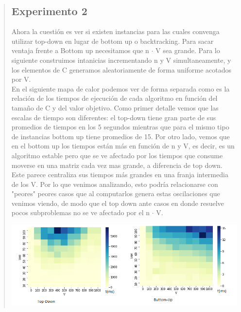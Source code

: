\documentclass[7pt,a4paper]{article}
\begin{document}
\begin{verse}
\subsection{Experimento 2}
Ahora la cuestión es ver si existen instancias para las cuales convenga utilizar top-down en lugar de bottom up o backtracking. Para sacar ventaja frente a Bottom up necesitamos que n $\cdot$ V sea grande.
Para lo siguiente construimos intanicias incrementando n y V simultaneamente, y los elementos de C generamos aleatoriamente de forma uniforme acotados por V.\\
En el siguiente mapa de calor podemos ver de forma separada como es la relación de los tiempos de ejecución de cada algoritmo en función del tamaño de C y del valor objetivo. Como primer detalle vemos que las escalas de tiempo son diferentes: el top-down tiene gran parte de sus promedios de tiempos en los 5 segundos mientras que para el mismo tipo de instancias bottom up tiene promedios de 15. Por otro lado, vemos que en el bottom up los tiempos están más en función de n y V, es decir, es un algoritmo estable pero que se ve afectado por los tiempos que consume moverse en una matriz cada vez mas grande, a diferencia de top down. Este parece centraliza sus tiempos más grandes en una franja intermedia de los V. Por lo que venimos analizando, esto podría relacionarse con "peores" peores casos que al computarlos genera estas oscilaciones que venimos viendo, de modo que el top down ante casos en donde resuelve pocos subproblemas no se ve afectado por el n $\cdot$ V.
\begin{center}
\includegraphics[scale=.4]{heatmap_td_vs_bu.png}
\end{center}

\end{verse}
\end{document}

